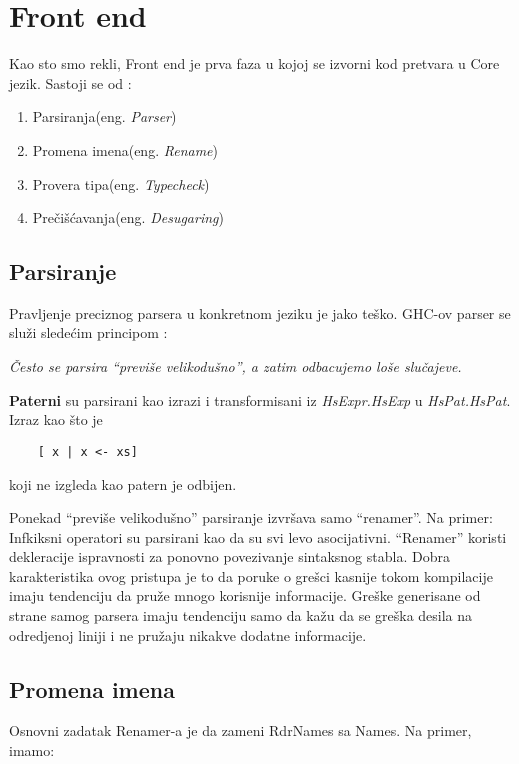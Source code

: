 \section{Front end}
\label{sec:frontend}

Kao sto smo rekli, Front end je prva faza u kojoj se izvorni kod pretvara u Core jezik. Sastoji se od :
	 \begin{enumerate}
	 	\item Parsiranja(eng. \emph{Parser})
	 	\item Promena imena(eng. \emph{Rename}) 
	 	\item Provera tipa(eng. \emph{Typecheck})
	 	\item Prečišćavanja(eng. \emph{Desugaring})
	 \end{enumerate}


\subsection{Parsiranje}
\label{subsec:podnaslovParse}

Pravljenje preciznog parsera u konkretnom jeziku je jako teško. GHC-ov parser se služi sledećim principom : 

\textit{Često se parsira “previše velikodušno”,  a zatim odbacujemo loše slučajeve.}

\textbf{Paterni} su parsirani kao izrazi i transformisani iz 
\textit{HsExpr.HsExp} u\textit{ HsPat.HsPat}. Izraz kao što je
\begin{verbatim}
	[ x | x <- xs]
\end{verbatim}  
koji ne izgleda kao patern je odbijen.

Ponekad “previše velikodušno” parsiranje izvršava samo “renamer”. Na primer:
Infkiksni operatori  su parsirani kao da su svi levo asocijativni. “Renamer” koristi dekleracije ispravnosti za ponovno povezivanje sintaksnog stabla. Dobra karakteristika ovog pristupa je to da poruke o grešci kasnije  tokom kompilacije imaju tendenciju da pruže mnogo korisnije informacije. Greške generisane od strane samog parsera imaju tendenciju samo da kažu da se greška desila na odredjenoj liniji i ne pružaju nikakve dodatne informacije.

\subsection{Promena imena}
\label{subsec:podnaslovRename}

Osnovni zadatak Renamer-a je da zameni RdrNames sa Names. Na primer, imamo:

